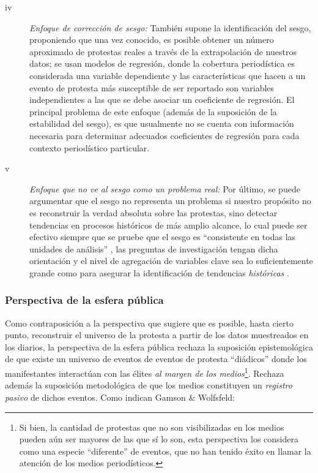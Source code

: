 \documentclass[letterpaper, 11pt]{book}
\theoremstyle{definition}
\theoremstyle{remark}
\begin{document}
\begin{description}
    \item[iv] \emph{Enfoque de corrección de sesgo:}  También supone la identificación del sesgo, proponiendo que una vez conocido, es posible obtener un número aproximado de protestas reales a través de la extrapolación de nuestros datos; se usan modelos de regresión, donde la cobertura periodística es considerada una variable dependiente y las características que hacen a un evento de protesta más susceptible de ser reportado son variables independientes a las que se debe asociar un coeficiente de regresión. 
    El principal problema de este enfoque (además de la suposición de la estabilidad del sesgo), es que usualmente no se cuenta con información necesaria para determinar adecuados coeficientes de regresión para cada contexto periodístico particular.
    
    \item[v] \emph{Enfoque que no ve al sesgo como un problema real:}  Por último, se puede argumentar que el sesgo no representa un problema si nuestro propósito no es reconstruir la verdad absoluta sobre las protestas, sino detectar tendencias en procesos históricos de más amplio alcance, lo cual puede ser efectivo siempre que se pruebe que el sesgo es ``consistente en todas las unidades de análisis'' \citep[253]{2002_Koopmans_AEP}, las preguntas de investigación tengan dicha orientación y el nivel de agregación de variables clave sea lo suficientemente grande como para asegurar la identificación de tendencias \emph{históricas} \citep[352]{2014_Hutter_AEP}.
\end{description}


\subsubsection{Perspectiva de la esfera pública}
\label{sec:esfera_publica}

Como contraposición a la perspectiva que sugiere que es posible, hasta cierto punto, reconstruir el universo de la protesta a partir de los datos muestreados en los diarios, la perspectiva de la esfera pública rechaza la suposición epistemológica de que existe un universo de eventos de eventos de protesta ``diádicos'' donde los manifestantes interactúan con las élites \emph{al margen de los medios}\footnote{
Si bien, la cantidad de protestas que no son visibilizadas en los medios pueden aún ser mayores de las que sí lo son, esta perspectiva los considera como una especie ``diferente'' de eventos, que no han tenido éxito en llamar la atención de los medios periodísticos.}. 
Rechaza además la suposición metodológica de que los medios constituyen un \emph{registro pasivo} de dichos eventos. Como indican Gamson \& Wolfsfeld:
\end{document}
